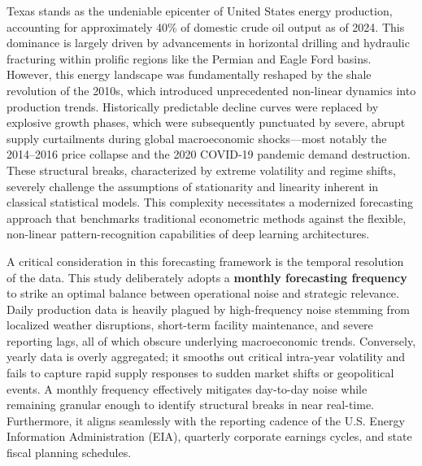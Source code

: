 \documentclass[12pt,a4paper]{article}
\begin{document}
Texas stands as the undeniable epicenter of United States energy production, accounting for approximately 40\% of domestic crude oil output as of 2024. This dominance is largely driven by advancements in horizontal drilling and hydraulic fracturing within prolific regions like the Permian and Eagle Ford basins. However, this energy landscape was fundamentally reshaped by the shale revolution of the 2010s, which introduced unprecedented non-linear dynamics into production trends. Historically predictable decline curves were replaced by explosive growth phases, which were subsequently punctuated by severe, abrupt supply curtailments during global macroeconomic shocks—most notably the 2014--2016 price collapse and the 2020 COVID-19 pandemic demand destruction. These structural breaks, characterized by extreme volatility and regime shifts, severely challenge the assumptions of stationarity and linearity inherent in classical statistical models. This complexity necessitates a modernized forecasting approach that benchmarks traditional econometric methods against the flexible, non-linear pattern-recognition capabilities of deep learning architectures.

A critical consideration in this forecasting framework is the temporal resolution of the data. This study deliberately adopts a \textbf{monthly forecasting frequency} to strike an optimal balance between operational noise and strategic relevance. Daily production data is heavily plagued by high-frequency noise stemming from localized weather disruptions, short-term facility maintenance, and severe reporting lags, all of which obscure underlying macroeconomic trends. Conversely, yearly data is overly aggregated; it smooths out critical intra-year volatility and fails to capture rapid supply responses to sudden market shifts or geopolitical events. A monthly frequency effectively mitigates day-to-day noise while remaining granular enough to identify structural breaks in near real-time. Furthermore, it aligns seamlessly with the reporting cadence of the U.S. Energy Information Administration (EIA), quarterly corporate earnings cycles, and state fiscal planning schedules.
\end{document}
